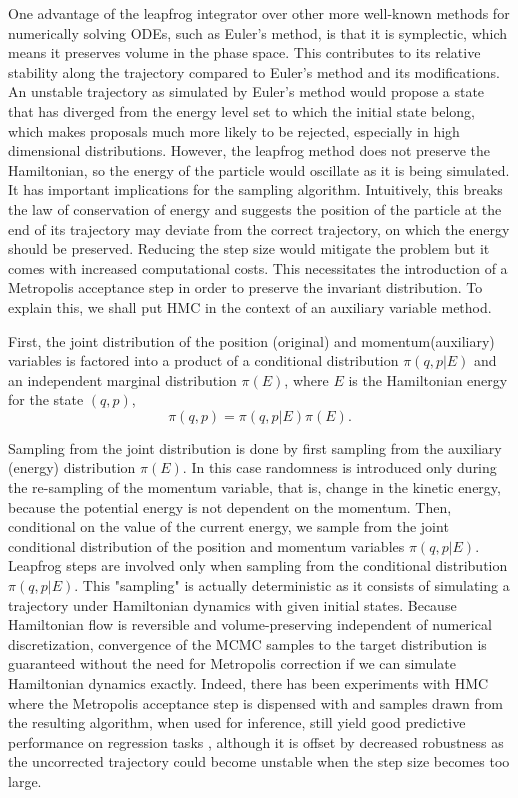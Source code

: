\documentclass[12pt]{report}
\begin{document}
One advantage of the leapfrog integrator over other more well-known methods for
numerically solving ODEs, such as Euler's method, is that it is symplectic, which
means it preserves volume in the phase space. This
contributes to its relative stability along the trajectory compared to Euler's
method and its modifications. An unstable trajectory as simulated by Euler's
method would propose a state that has diverged from the energy level set to
which the initial state belong, which makes proposals much more likely to be
rejected, especially in high dimensional distributions.  However,
the leapfrog method does not preserve the Hamiltonian, so the energy of the particle would
oscillate as it is being simulated. It has important implications for the
sampling algorithm. Intuitively, this breaks the law of conservation of energy
and suggests the position of the particle at the end of its trajectory may
deviate from the correct trajectory, on which the energy should be preserved.
Reducing the step size would mitigate the problem but it comes with increased
computational costs. This necessitates the introduction of a Metropolis
acceptance step in order to preserve the invariant distribution. To explain
this, we shall put HMC in the context of an auxiliary variable method. 

First, the joint distribution of the position (original) and momentum(auxiliary)
variables is factored into a product of a conditional distribution $\pi(q,p|E)$ and an
independent marginal distribution $\pi(E)$, where $E$ is the Hamiltonian energy for the state $(q,p)$,
\[ \pi(q,p) = \pi(q,p|E)\pi(E) .\]

Sampling from the joint distribution is done by first sampling from the
auxiliary (energy) distribution $\pi(E)$. In this case randomness is introduced only during  the
re-sampling of the momentum variable, that is, change in the kinetic energy,
because the potential energy is not dependent on the momentum. Then, conditional on the value of the
current energy, we sample from the joint
conditional distribution of the position and momentum variables $\pi(q,p|E)$. Leapfrog steps
are involved only when sampling from the conditional distribution $\pi(q,p|E)$.
This "sampling" is actually deterministic as it consists of simulating a
trajectory under Hamiltonian dynamics with given initial states. Because
Hamiltonian flow is reversible and volume-preserving independent of numerical
discretization, convergence of the MCMC samples to the target distribution is guaranteed without the need for Metropolis
correction if we can simulate Hamiltonian dynamics exactly. Indeed, there has
been experiments with HMC where the Metropolis acceptance step is dispensed with
and samples drawn from the resulting algorithm, when used for inference, still yield good predictive
performance on regression tasks \cite{neal2012bayesian}, although it is offset
by
decreased robustness as the uncorrected trajectory could become unstable when
the step size becomes too large.
 
\end{document}
